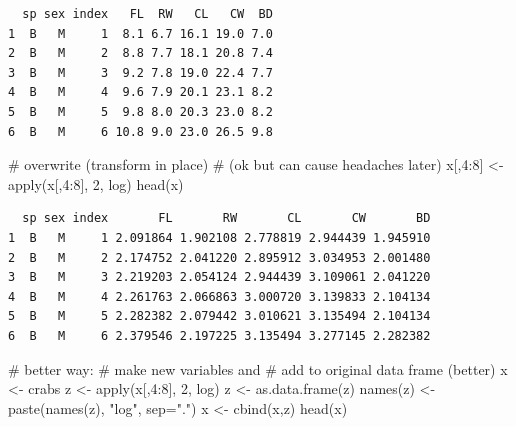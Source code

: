 \documentclass[
  13,
  letterpaper,
]{report}
\newenvironment{Shaded}{\begin{snugshade}}{\end{snugshade}}
\newcommand{\AttributeTok}[1]{\textcolor[rgb]{0.40,0.45,0.13}{#1}}
\newcommand{\CommentTok}[1]{\textcolor[rgb]{0.37,0.37,0.37}{#1}}
\newcommand{\DecValTok}[1]{\textcolor[rgb]{0.68,0.00,0.00}{#1}}
\newcommand{\FunctionTok}[1]{\textcolor[rgb]{0.28,0.35,0.67}{#1}}
\newcommand{\NormalTok}[1]{\textcolor[rgb]{0.00,0.23,0.31}{#1}}
\newcommand{\OtherTok}[1]{\textcolor[rgb]{0.00,0.23,0.31}{#1}}
\newcommand{\SpecialCharTok}[1]{\textcolor[rgb]{0.37,0.37,0.37}{#1}}
\newcommand{\StringTok}[1]{\textcolor[rgb]{0.13,0.47,0.30}{#1}}
\begin{document}
\begin{verbatim}
  sp sex index   FL  RW   CL   CW  BD
1  B   M     1  8.1 6.7 16.1 19.0 7.0
2  B   M     2  8.8 7.7 18.1 20.8 7.4
3  B   M     3  9.2 7.8 19.0 22.4 7.7
4  B   M     4  9.6 7.9 20.1 23.1 8.2
5  B   M     5  9.8 8.0 20.3 23.0 8.2
6  B   M     6 10.8 9.0 23.0 26.5 9.8
\end{verbatim}

\begin{Shaded}
\begin{Highlighting}[]
\CommentTok{\# overwrite (transform in place)}
\CommentTok{\# (ok but can cause headaches later)}
\NormalTok{x[,}\DecValTok{4}\SpecialCharTok{:}\DecValTok{8}\NormalTok{] }\OtherTok{\textless{}{-}} \FunctionTok{apply}\NormalTok{(x[,}\DecValTok{4}\SpecialCharTok{:}\DecValTok{8}\NormalTok{], }\DecValTok{2}\NormalTok{, log)}
\FunctionTok{head}\NormalTok{(x)}
\end{Highlighting}
\end{Shaded}

\begin{verbatim}
  sp sex index       FL       RW       CL       CW       BD
1  B   M     1 2.091864 1.902108 2.778819 2.944439 1.945910
2  B   M     2 2.174752 2.041220 2.895912 3.034953 2.001480
3  B   M     3 2.219203 2.054124 2.944439 3.109061 2.041220
4  B   M     4 2.261763 2.066863 3.000720 3.139833 2.104134
5  B   M     5 2.282382 2.079442 3.010621 3.135494 2.104134
6  B   M     6 2.379546 2.197225 3.135494 3.277145 2.282382
\end{verbatim}

\begin{Shaded}
\begin{Highlighting}[]
\CommentTok{\# better way:}
\CommentTok{\# make new variables and }
\CommentTok{\# add to original data frame (better)}
\NormalTok{x }\OtherTok{\textless{}{-}}\NormalTok{ crabs}
\NormalTok{z }\OtherTok{\textless{}{-}} \FunctionTok{apply}\NormalTok{(x[,}\DecValTok{4}\SpecialCharTok{:}\DecValTok{8}\NormalTok{], }\DecValTok{2}\NormalTok{, log)}
\NormalTok{z }\OtherTok{\textless{}{-}} \FunctionTok{as.data.frame}\NormalTok{(z)}
\FunctionTok{names}\NormalTok{(z) }\OtherTok{\textless{}{-}} \FunctionTok{paste}\NormalTok{(}\FunctionTok{names}\NormalTok{(z), }\StringTok{"log"}\NormalTok{, }\AttributeTok{sep=}\StringTok{"."}\NormalTok{)}
\NormalTok{x }\OtherTok{\textless{}{-}} \FunctionTok{cbind}\NormalTok{(x,z)}
\FunctionTok{head}\NormalTok{(x)}
\end{Highlighting}
\end{Shaded}
\end{document}
